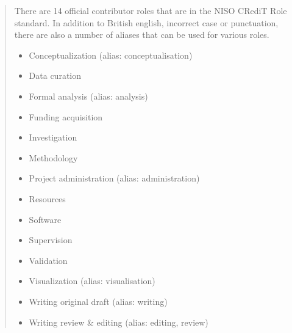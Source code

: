 \documentclass[letterpaper,12pt,english]{sphinxmanual}
\begin{document}
\begin{sphinxVerbatim}[commandchars=\\\{\}]
\end{sphinxVerbatim}
\begin{quote}

\sphinxAtStartPar
{}

\sphinxAtStartPar
There are 14 official contributor roles that are in the NISO CRediT Role standard. In addition to British english, incorrect case or punctuation, there are also a number of aliases that can be used for various roles.
\begin{itemize}
\item {} 
\sphinxAtStartPar
Conceptualization (alias: conceptualisation)

\item {} 
\sphinxAtStartPar
Data curation

\item {} 
\sphinxAtStartPar
Formal analysis (alias: analysis)

\item {} 
\sphinxAtStartPar
Funding acquisition

\item {} 
\sphinxAtStartPar
Investigation

\item {} 
\sphinxAtStartPar
Methodology

\item {} 
\sphinxAtStartPar
Project administration (alias: administration)

\item {} 
\sphinxAtStartPar
Resources

\item {} 
\sphinxAtStartPar
Software

\item {} 
\sphinxAtStartPar
Supervision

\item {} 
\sphinxAtStartPar
Validation

\item {} 
\sphinxAtStartPar
Visualization (alias: visualisation)

\item {} 
\sphinxAtStartPar
Writing \sphinxhyphen{} original draft (alias: writing)

\item {} 
\sphinxAtStartPar
Writing \sphinxhyphen{} review \& editing (alias: editing, review)

\end{itemize}
\end{quote}
\end{document}
